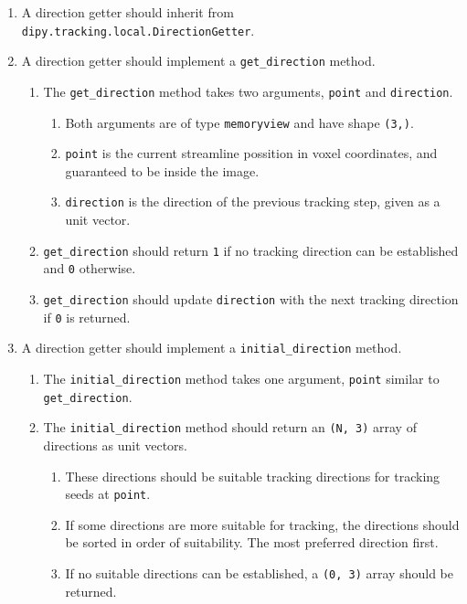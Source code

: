 \begin{enumerate}
\item A direction getter should inherit from \verb|dipy.tracking.local.DirectionGetter|.
\item A direction getter should implement a \verb|get_direction| method.
\begin{enumerate}
\item The \verb|get_direction| method takes two arguments, \verb|point| and \verb|direction|.
\begin{enumerate}
\item Both arguments are of type \verb|memoryview| and have shape \verb|(3,)|.
\item \verb|point| is the current streamline possition in voxel coordinates, and guaranteed to be inside the image.
\item \verb|direction| is the direction of the previous tracking step, given as a unit vector.
\end{enumerate}
\item \verb|get_direction| should return \verb|1| if no tracking direction can be established and \verb|0| otherwise.
\item \verb|get_direction| should update \verb|direction| with the next tracking direction if \verb|0| is returned.
\end{enumerate}
\item A direction getter should implement a \verb|initial_direction| method.
\begin{enumerate}
\item The \verb|initial_direction| method takes one argument, \verb|point| similar to \verb|get_direction|.
\item The \verb|initial_direction| method should return an \verb|(N, 3)| array of directions as unit vectors.
\begin{enumerate}
\item These directions should be suitable tracking directions for tracking seeds at \verb|point|.
\item If some directions are more suitable for tracking, the directions should be sorted in order of suitability. The most preferred direction first.  
\item If no suitable directions can be established, a \verb|(0, 3)| array should be returned.
\end{enumerate}
\end{enumerate}
\end{enumerate}